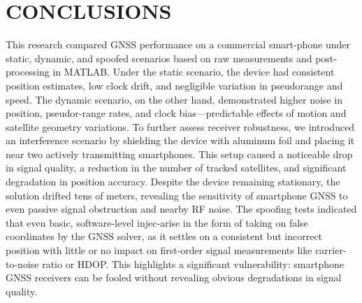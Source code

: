 
\section{CONCLUSIONS} \label{sec:conclusions}

    This research compared GNSS performance on a commercial smart-phone under static, dynamic, and spoofed scenarios based on raw measurements and post-processing in MATLAB. Under the static scenario, the device had consistent position estimates, low clock drift, and negligible variation in pseudorange and speed. The dynamic scenario, on the other hand, demonstrated higher noise in position, pseudor-range rates, and clock bias—predictable effects of motion and satellite geometry variations.
    To further assess receiver robustness, we introduced an interference scenario by shielding the device with aluminum foil and placing it near two actively transmitting smartphones. This setup caused a noticeable drop in signal quality, a reduction in the number of tracked satellites, and significant degradation in position accuracy. Despite the device remaining stationary, the solution drifted tens of meters, revealing the sensitivity of smartphone GNSS to even passive signal obstruction and nearby RF noise.
    The spoofing tests indicated that even basic, software-level injec-arise in the form of taking on false coordinates by the GNSS solver, as it settles on a consistent but incorrect position with little or no impact on first-order signal measurements like carrier-to-noise ratio or HDOP. This highlights a significant vulnerability: smartphone GNSS receivers can be fooled without revealing obvious degradations in signal quality.